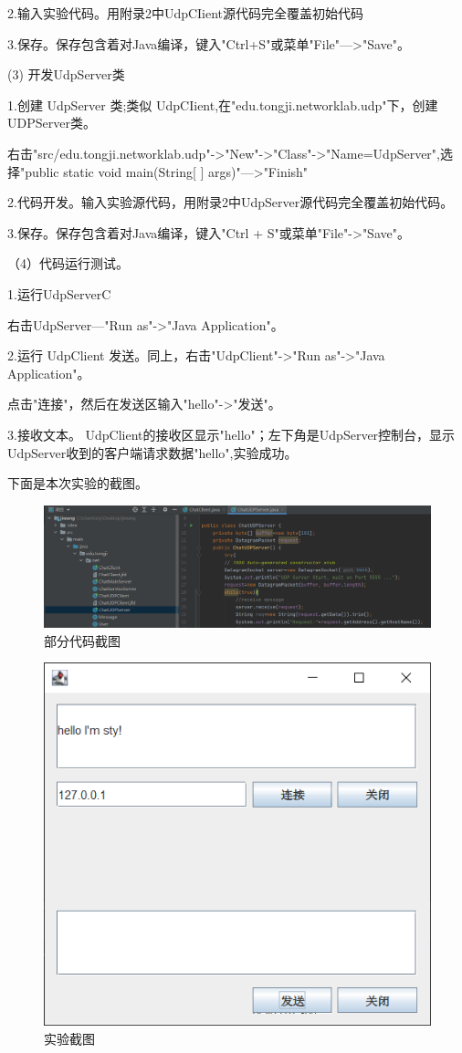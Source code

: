 \documentclass[lang=cn,11pt,a4paper,cite=authoryear]{elegantpaper}
\begin{document}
	2.输入实验代码。用附录2中UdpCIient源代码完全覆盖初始代码

	3.保存。保存包含着对Java编译，键入"Ctrl+S"或菜单"File"—>"Save"。

(3)	开发UdpServer类

	1.创建 UdpServer 类;类似 UdpCIient,在"edu.tongji.networklab.udp"下，创建 UDPServer类。 

右击"src/edu.tongji.networklab.udp"->"New"->"Class"->"Name=UdpServer",选择"public static void main(String[ ] args)"—>"Finish"

	2.代码开发。输入实验源代码，用附录2中UdpServer源代码完全覆盖初始代码。

	3.保存。保存包含着对Java编译，键入"Ctrl + S"或菜单"File"->"Save"。

（4）代码运行测试。

	1.运行UdpServerC

右击UdpServer—"Run as"->"Java Application"。

	2.运行 UdpClient 发送。同上，右击"UdpClient"->"Run as"->"Java Application"。

点击"连接"，然后在发送区输入"hello"->"发送"。

	3.接收文本。
UdpClient的接收区显示"hello"；左下角是UdpServer控制台，显示UdpServer收到的客户端请求数据"hello",实验成功。

下面是本次实验的截图。

\begin{figure}[htbp]
	\centering
	\includegraphics[width=0.9\linewidth]{image/screenshot006}
	\caption{部分代码截图}
	\label{fig:screenshot006}
\end{figure}


\begin{figure}[htbp]
	\centering
	\includegraphics[width=0.7\linewidth]{image/screenshot005}
	\caption{实验截图}
	\label{fig:screenshot005}
\end{figure}
\end{document}
